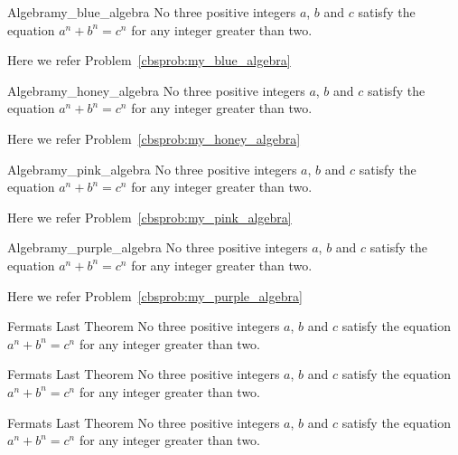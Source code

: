 \documentclass[11pt, letterpaper]{../exercise}
\begin{document}
    \begin{cbblueproblem}{Algebra}{my_blue_algebra}
    No three positive integers \(a\), \(b\) and \(c\) satisfy the equation
    \(a^{n} + b^{n} = c^{n}\) for any integer greater than two.
    \end{cbblueproblem}
    Here we refer Problem~\ref{cbsprob:my_blue_algebra}%

    \begin{cbhoneyproblem}{Algebra}{my_honey_algebra}
    No three positive integers \(a\), \(b\) and \(c\) satisfy the equation
    \(a^{n} + b^{n} = c^{n}\) for any integer greater than two.
    \end{cbhoneyproblem}
    Here we refer Problem~\ref{cbsprob:my_honey_algebra}%

    \begin{cbpinkproblem}{Algebra}{my_pink_algebra}
    No three positive integers \(a\), \(b\) and \(c\) satisfy the equation
    \(a^{n} + b^{n} = c^{n}\) for any integer greater than two.
    \end{cbpinkproblem}
    Here we refer Problem~\ref{cbsprob:my_pink_algebra}%

    \begin{cbpurpleproblem}{Algebra}{my_purple_algebra}
    No three positive integers \(a\), \(b\) and \(c\) satisfy the equation
    \(a^{n} + b^{n} = c^{n}\) for any integer greater than two.
    \end{cbpurpleproblem}
    Here we refer Problem~\ref{cbsprob:my_purple_algebra}%

    \begin{cbbred}{Fermats Last Theorem}
    No three positive integers \(a\), \(b\) and \(c\) satisfy the equation
    \(a^{n} + b^{n} = c^{n}\) for any integer greater than two.
    \end{cbbred}

    \begin{cbbgreen}{Fermats Last Theorem}
    No three positive integers \(a\), \(b\) and \(c\) satisfy the equation
    \(a^{n} + b^{n} = c^{n}\) for any integer greater than two.
    \end{cbbgreen}

    \begin{cbbblue}{Fermats Last Theorem}
    No three positive integers \(a\), \(b\) and \(c\) satisfy the equation
    \(a^{n} + b^{n} = c^{n}\) for any integer greater than two.
    \end{cbbblue}
\end{document}
